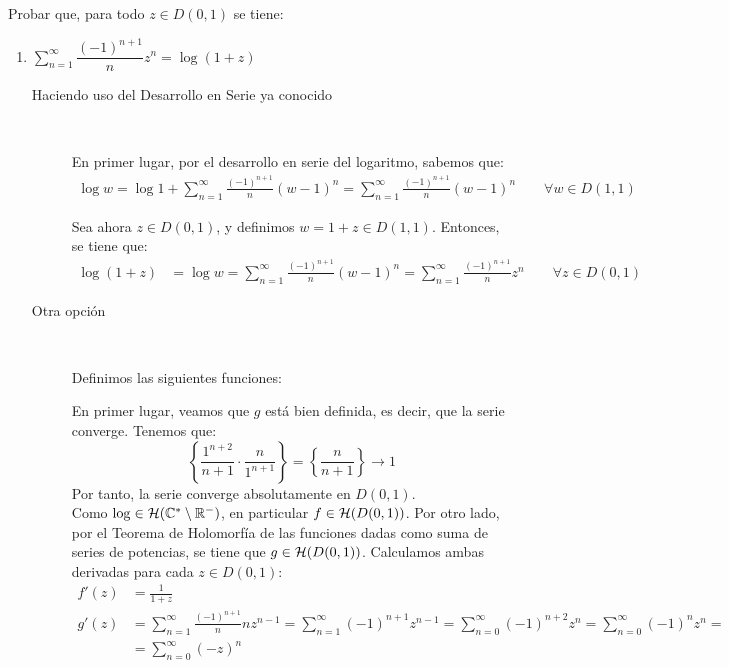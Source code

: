 \begin{ejercicio}
    Probar que, para todo $z \in D(0,1)$ se tiene:
    \begin{enumerate}
        \item $\sum\limits_{n= 1}^\infty \dfrac{(-1)^{n+1}}{n}z^n = \log(1+z)$
        
        \begin{description}
            \item[Haciendo uso del Desarrollo en Serie ya conocido]~
            
            En primer lugar, por el desarrollo en serie del logaritmo, sabemos que:
            \begin{align*}
                \log w = \log 1 + \sum_{n=1}^\infty \frac{(-1)^{n+1}}{n}\left(w - 1\right)^n = \sum_{n=1}^\infty \frac{(-1)^{n+1}}{n}\left(w - 1\right)^n\qquad \forall w\in D(1,1)
            \end{align*}

            Sea ahora $z\in D(0,1)$, y definimos $w = 1+z\in D(1,1)$. Entonces, se tiene que:
            \begin{align*}
                \log(1+z) &= \log w = \sum_{n=1}^\infty \frac{(-1)^{n+1}}{n}\left(w - 1\right)^n = \sum_{n=1}^\infty \frac{(-1)^{n+1}}{n}z^n\qquad \forall z\in D(0,1)
            \end{align*}

            \item[Otra opción]~
            
            Definimos las siguientes funciones:

            En primer lugar, veamos que $g$ está bien definida, es decir, que la serie converge. Tenemos que:
            \begin{equation*}
                \left\{\dfrac{1^{n+2}}{n+1}\cdot \dfrac{n}{1^{n+1}}\right\} = \left\{\dfrac{n}{n+1}\right\}\to 1
            \end{equation*}
            Por tanto, la serie converge absolutamente en $D(0,1)$.\\

            Como $\log\in \mathcal{H}(\mathbb{C}^*\setminus\mathbb{R}^-)$, en particular $f\in \mathcal{H}(D(0,1))$. Por otro lado, por el Teorema de Holomorfía de las funciones dadas como suma de series de potencias, se tiene que $g\in \mathcal{H}(D(0,1))$. Calculamos ambas derivadas para cada $z\in D(0,1)$:
            \begin{align*}
                f'(z) &= \frac{1}{1+z} \\
                g'(z) &= \sum_{n=1}^\infty \frac{(-1)^{n+1}}{n}nz^{n-1} = \sum_{n=1}^\infty (-1)^{n+1}z^{n-1} = \sum_{n=0}^\infty (-1)^{n+2}z^{n} = \sum_{n=0}^\infty (-1)^{n}z^{n}
                =\\&= \sum_{n=0}^\infty (-z)^{n}
            \end{align*}


\end{description}
\end{enumerate}
\end{ejercicio}
